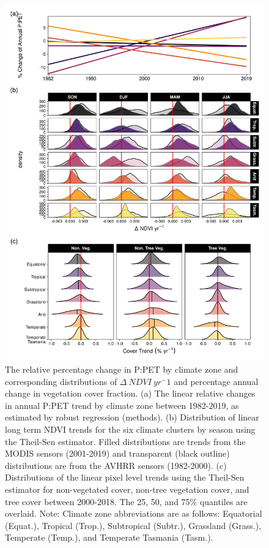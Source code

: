 \documentclass[
]{article}
\begin{document}
\clearpage 
\begin{figure}
\includegraphics[width=12cm]{../../figures/Fig8_PPET_change_ThielSen_VCF} \caption{The relative percentage change in P:PET by climate zone and corresponding distributions of $\Delta~NDVI~yr^-1$ and percentage annual change in vegetation cover fraction. (a) The linear relative changes in annual P:PET trend by climate zone between 1982-2019, as estimated by robust regression (methods). (b) Distribution of linear long term NDVI trends for the six climate clusters by season using the Theil-Sen estimator. Filled distributions are trends from the MODIS sensors (2001-2019) and transparent (black outline) distributions are from the AVHRR sensors (1982-2000). (c) Distributions of the linear pixel level trends using the Theil-Sen estimator for non-vegetated cover, non-tree vegetation cover, and tree cover between 2000-2018. The 25, 50, and 75\% quantiles are overlaid. \newline Note: Climate zone abbreviations are as follows: Equatorial (Equat.), Tropical (Trop.), Subtropical (Subtr.), Grassland (Grass.), Temperate (Temp.), and Temperate Tasmania (Tasm.).}\label{fig:unnamed-chunk-7}
\end{figure}
\clearpage
\end{document}
